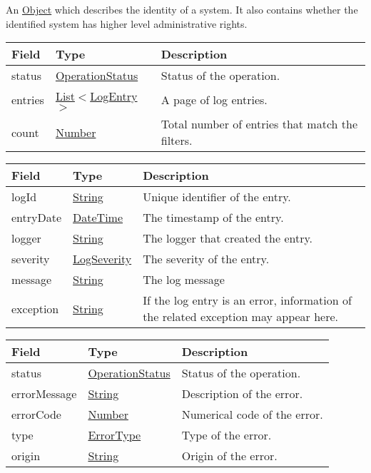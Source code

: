 \documentclass[a4paper]{arrowhead}
\newcommand{\pref}[1]{{\textcolor{ArrowheadGrey}{\hyperref[sec:model:primitives:#1]{#1}}}}
\begin{document}

An \pref{Object} which describes the identity of a system. It also contains whether the identified system has higher level administrative rights.


\begin{table}[ht!]
\begin{tabularx}{\textwidth}{| p{2.5cm} | p{2.5cm} | X |} \hline
\rowcolor{gray!33} Field & Type      & Description \\ \hline
status & \pref{OperationStatus} & Status of the operation. \\ \hline
entries & \pref{List}$<$\hyperref[sec:model:LogEntry]{LogEntry}$>$ & A page of log entries. \\ \hline
count & \pref{Number} & Total number of entries that match the filters. \\ \hline
\end{tabularx}
\end{table}

\clearpage

 
\begin{table}[ht!]
\begin{tabularx}{\textwidth}{| p{2.5cm} | p{2.5cm} | X |} \hline
\rowcolor{gray!33} Field & Type      & Description \\ \hline
logId & \pref{String} & Unique identifier of the entry. \\ \hline
entryDate & \pref{DateTime} & The timestamp of the entry. \\ \hline
logger & \pref{String} & The logger that created the entry. \\ \hline
severity & \pref{LogSeverity} & The severity of the entry. \\ \hline
message & \pref{String} & The log message \\ \hline
exception & \pref{String} & If the log entry is an error, information of the related exception may appear here. \\ \hline
\end{tabularx}
\end{table}


\begin{table}[ht!]
\begin{tabularx}{\textwidth}{| p{2.5cm} | p{3cm} | X |} \hline
\rowcolor{gray!33} Field & Type      & Description \\ \hline
status & \pref{OperationStatus} & Status of the operation. \\ \hline
errorMessage & \pref{String} & Description of the error. \\ \hline
errorCode &\pref{Number}  & Numerical code of the error. \\ \hline
type & \pref{ErrorType} & Type of the error. \\ \hline
origin & \pref{String} & Origin of the error. \\ \hline
\end{tabularx}
\end{table}
\end{document}
